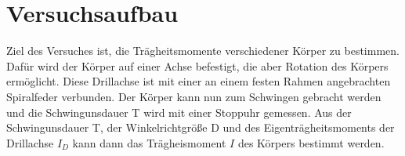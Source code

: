 \section{Versuchsaufbau}
\label{sec:Versuchsaufbau}
Ziel des Versuches ist, die Trägheitsmomente verschiedener Körper zu bestimmen. 
Dafür wird der Körper auf einer Achse befestigt, die aber Rotation des Körpers ermöglicht. %
Diese Drillachse ist mit einer an einem festen Rahmen angebrachten Spiralfeder verbunden.
Der Körper kann nun zum Schwingen gebracht werden und die Schwingunsdauer T wird mit einer Stoppuhr gemessen.
Aus der Schwingunsdauer T, der Winkelrichtgröße D und des Eigenträgheitsmoments der Drillachse $I_D$  
kann dann das Trägheismoment $I$ des Körpers bestimmt werden. %

